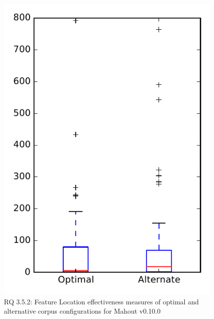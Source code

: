 
\begin{figure}
\centering
\includegraphics[height=0.4\textheight]{figures/combo/flt_rq2_mahout}
\caption{RQ 3.5.2: Feature Location effectiveness measures of optimal and alternative corpus configurations for Mahout v0.10.0}
\label{fig:combo:flt:rq2:mahout}
\end{figure}
